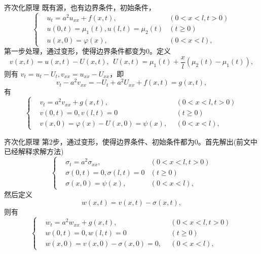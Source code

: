 \documentclass[11pt]{beamer}
\begin{document}
\begin{frame}{齐次化原理}
既有源，也有边界条件，初始条件，
\begin{equation}
\left\{
\begin{aligned}
& u_t = a^2 u_{xx} + f(x,t), ~~  & ( 0 < x < l, t>0) \\
& u(0,t) = \mu_1 (t), u(l,t) = \mu_2 (t) & ( t \geq 0) \\
& u(x,0) = \varphi(x), ~~ & ( 0 <x< l ),
\end{aligned}
\right.
\end{equation}
第一步处理，通过变形，使得边界条件都变为0。定义
\begin{equation}
v(x,t) = u(x,t) - U(x,t), ~~U(x,t) = \mu_1 (t) + \frac{x}{l}( \mu_2(t) - \mu_1(t) ),
\end{equation}
则有 $ v_t = u_t - U_t, v_{xx} = u_{xx} - U_{xx} $，即
\begin{equation}
v_t - a^2 v_{xx} = - U_t + a^2 U_{xx} + f(x,t) = g(x,t),
\end{equation}
有
\begin{equation}
\left\{
\begin{aligned}
& v_t = a^2 v_{xx} + g(x,t), ~~  & ( 0 < x < l, t>0) \\
& v(0,t) = 0, v(l,t) = 0 & ( t \geq 0) \\
& v(x,0) = \varphi(x) - U(x,0) = \psi(x), ~~ & ( 0 <x< l ),
\end{aligned}
\right.
\end{equation}
\end{frame}

\begin{frame}{齐次化原理}
第2步，通过变形，使得边界条件、初始条件都为0。首先解出(前文中已经解释求解方法)
\begin{equation}
\left\{
\begin{aligned}
& \sigma_t = a^2 \sigma_{xx}, ~~  & ( 0 < x < l, t>0) \\
& \sigma(0,t) = 0, \sigma(l,t) = 0 & ( t \geq 0) \\
& \sigma(x,0) = \psi(x), ~~ & ( 0 <x< l ),
\end{aligned}
\right.
\end{equation}
然后定义
\begin{equation}
w(x,t) = v(x,t) - \sigma(x,t),
\end{equation}
则有 
\begin{equation}
\left\{
\begin{aligned}
& w_t = a^2 w_{xx} + g(x,t), ~~  & ( 0 < x < l, t>0) \\
& w(0,t) = 0, w(l,t) = 0 & ( t \geq 0) \\
& w(x,0) = v(x,0) - \sigma(x,0) = 0, ~~ & ( 0 <x< l ),
\end{aligned}
\right.
\end{equation}
\end{frame}
\end{document}
